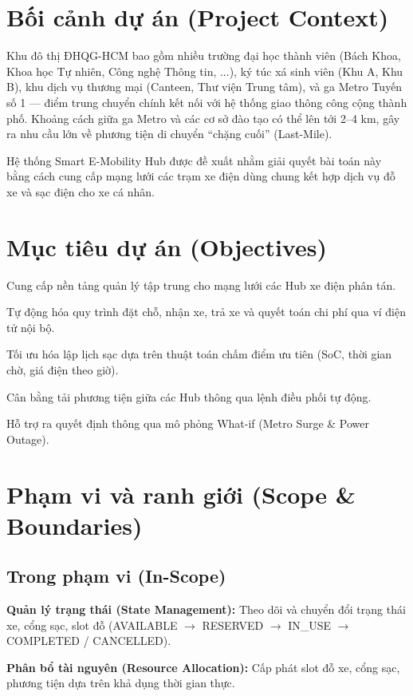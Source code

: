 \documentclass[12pt,a4paper]{report}
\begin{document}
\section{Bối cảnh dự án (Project Context)}
Khu đô thị ĐHQG-HCM bao gồm nhiều trường đại học thành viên (Bách Khoa, Khoa học Tự nhiên, Công nghệ Thông tin, ...), ký túc xá sinh viên (Khu A, Khu B), khu dịch vụ thương mại (Canteen, Thư viện Trung tâm), và ga Metro Tuyến số 1 --- điểm trung chuyển chính kết nối với hệ thống giao thông công cộng thành phố. Khoảng cách giữa ga Metro và các cơ sở đào tạo có thể lên tới 2--4 km, gây ra nhu cầu lớn về phương tiện di chuyển ``chặng cuối'' (Last-Mile).

Hệ thống Smart E-Mobility Hub được đề xuất nhằm giải quyết bài toán này bằng cách cung cấp mạng lưới các trạm xe điện dùng chung kết hợp dịch vụ đỗ xe và sạc điện cho xe cá nhân.

\section{Mục tiêu dự án (Objectives)}

Cung cấp nền tảng quản lý tập trung cho mạng lưới các Hub xe điện phân tán.

Tự động hóa quy trình đặt chỗ, nhận xe, trả xe và quyết toán chi phí qua ví điện tử nội bộ.

Tối ưu hóa lập lịch sạc dựa trên thuật toán chấm điểm ưu tiên (SoC, thời gian chờ, giá điện theo giờ).

Cân bằng tải phương tiện giữa các Hub thông qua lệnh điều phối tự động.

Hỗ trợ ra quyết định thông qua mô phỏng What-if (Metro Surge \& Power Outage).

\section{Phạm vi và ranh giới (Scope \& Boundaries)}

\subsection{Trong phạm vi (In-Scope)}

\textbf{Quản lý trạng thái (State Management):} Theo dõi và chuyển đổi trạng thái xe, cổng sạc, slot đỗ (AVAILABLE $\rightarrow$ RESERVED $\rightarrow$ IN\_USE $\rightarrow$ COMPLETED / CANCELLED).

\textbf{Phân bổ tài nguyên (Resource Allocation):} Cấp phát slot đỗ xe, cổng sạc, phương tiện dựa trên khả dụng thời gian thực.
\end{document}
